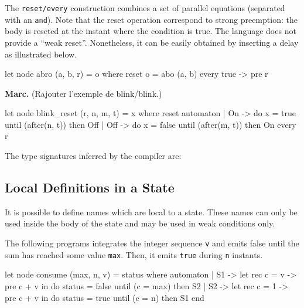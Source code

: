 \documentclass[11pt,titlepage,twoside]{report}
\newcommand{\Marc}[1]{{\bf Marc.} ({#1})}
\begin{document}
The \verb-reset/every- construction combines a set of parallel
equations (separated with an \verb-and-). Note that the reset
operation correspond to strong preemption: the body is reseted at the
instant where the condition is true. The language does not provide a
``weak reset''. Nonetheless, it can be easily obtained by inserting a
delay as illustrated below.

\begin{runverbatim}
  let node abro (a, b, r) = o where
    reset
      o = abo (a, b)
    every true -> pre r
\end{runverbatim}



\Marc{Rajouter l'exemple de blink/blink.}

\begin{runverbatim}
let node blink_reset (r, n, m, t) = x where
 reset
   automaton
   | On  -> do x = true  until (after(n, t)) then Off
   | Off -> do x = false until (after(m, t)) then On
 every r
\end{runverbatim}

\medskip
The type signatures inferred by the compiler are:
\runverbatimmsg

\subsection{Local Definitions in a State}
It is possible to define names which are local to a state. These names
can only be used inside the body of the state and may be used in weak
conditions only.

The following programs integrates the integer sequence \verb-v- and
emits false until the sum has reached some value \verb-max-. Then, it
emits \verb-true- during \verb-n- instants.

\begin{runverbatim}
let node consume (max, n, v) = status where
  automaton
  | S1 ->
      let rec c = v -> pre c + v in
      do status = false
      until (c = max) then S2
  | S2 ->
      let rec c = 1 -> pre c + v in
      do status = true
      until (c = n) then S1
  end
\end{runverbatim}
\end{document}

